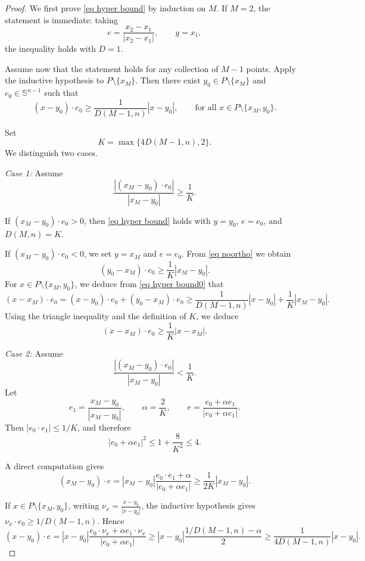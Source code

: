 \documentclass[10pt,a4paper]{amsart}
\begin{document}
\begin{proof}
We first prove \eqref{eq hyper bound} by induction on \(M\). If \(M=2\), the statement is immediate: taking
\[
e=\frac{x_2-x_1}{|x_2-x_1|},
\qquad
y=x_1,
\]
the inequality holds with \(D=1\).

Assume now that the statement holds for any collection of \(M-1\) points.  
Apply the inductive hypothesis to \(P\setminus\{x_M\}\). Then there exist 
\(y_0\in P\setminus\{x_M\}\) and \(e_0\in\mathbb S^{n-1}\) such that
\begin{equation}\label{eq hyper bound0}
(x-y_0)\cdot e_0
\ge
\frac{1}{D(M-1,n)}|x-y_0|,
\qquad
\text{for all } x\in P\setminus\{x_M,y_0\}.
\end{equation}

Set
\[
K=\max\{4D(M-1,n),2\}.
\]
We distinguish two cases.

\medskip
\noindent
\textit{Case 1:} Assume
\begin{equation}\label{eq noortho}
\frac{|(x_M-y_0)\cdot e_0|}{|x_M-y_0|}
\ge
\frac{1}{K}.
\end{equation}

If \((x_M-y_0)\cdot e_0>0\), then \eqref{eq hyper bound} holds with 
\(y=y_0\), \(e=e_0\), and \(D(M,n)=K\).

If \((x_M-y_0)\cdot e_0<0\), we set \(y=x_M\) and \(e=e_0\).  
From \eqref{eq noortho} we obtain
\[
(y_0-x_M)\cdot e_0
\ge
\frac{1}{K}|x_M-y_0|.
\]
For \(x\in P\setminus\{x_M,y_0\}\), we deduce from \eqref{eq hyper bound0} that
\[
(x-x_M)\cdot e_0
=
(x-y_0)\cdot e_0+(y_0-x_M)\cdot e_0
\ge
\frac{1}{D(M-1,n)}|x-y_0|
+
\frac{1}{K}|x_M-y_0|.
\]
Using the triangle inequality and the definition of \(K\), we deduce
\[
(x-x_M)\cdot e_0
\ge
\frac{1}{K}|x-x_M|.
\]

\medskip
\noindent
\textit{Case 2:} Assume
\begin{equation}\label{eq aortho}
\frac{|(x_M-y_0)\cdot e_0|}{|x_M-y_0|}
<
\frac{1}{K}.
\end{equation}
Let
\[
e_1=\frac{x_M-y_0}{|x_M-y_0|},
\qquad
\alpha=\frac{2}{K},
\qquad
e=\frac{e_0+\alpha e_1}{|e_0+\alpha e_1|}.
\]
Then \(|e_0\cdot e_1|\le 1/K\), and therefore
\begin{equation}\label{eq e1e2}
|e_0+\alpha e_1|^2
\le
1+\frac{8}{K^2}
\le 4.
\end{equation}

A direct computation gives
\[
(x_M-y_0)\cdot e
=
|x_M-y_0|
\frac{e_0\cdot e_1+\alpha}{|e_0+\alpha e_1|}
\ge
\frac{1}{2K}|x_M-y_0|.
\]

If \(x\in P\setminus\{x_M,y_0\}\), writing 
\(\nu_x=\frac{x-y_0}{|x-y_0|}\), the inductive hypothesis gives
\(\nu_x\cdot e_0\ge 1/D(M-1,n)\). Hence
\[
(x-y_0)\cdot e
=
|x-y_0|
\frac{e_0\cdot\nu_x+\alpha e_1\cdot\nu_x}{|e_0+\alpha e_1|}
\ge |x-y_0|
\frac{1/D(M-1,n)-\alpha }{2} \ge
\frac{1}{4D(M-1,n)}|x-y_0|.
\]


\end{proof}
\end{document}
